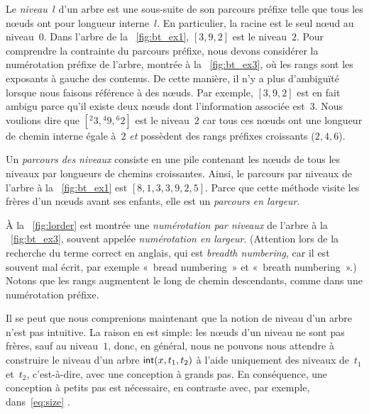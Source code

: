 
Le \emph{niveau}~\(l\) d'un arbre est une
sous-suite de son parcours préfixe telle
que tous les nœuds ont pour longueur
interne~\(l\). En particulier, la racine
est le seul nœud au niveau~\(0\). Dans l'arbre de la
\fig~\vref{fig:bt_ex1}, \([3,9,2]\) est le niveau~\(2\). Pour
comprendre la contrainte du parcours préfixe, nous devons considérer
la numérotation préfixe de l'arbre, montrée à la
\fig~\vref{fig:bt_ex3}, où les rangs sont les exposants à gauche des
contenus. De cette manière, il n'y a plus d'ambiguïté lorsque nous
faisons référence à des nœuds. Par exemple, \([3,9,2]\) est en
fait ambigu parce qu'il existe deux nœuds dont l'information
associée est~\(3\). Nous voulions dire que \([{}^{2}{3}, {}^{4}{9},
{}^{6}{2}]\) est le niveau~\(2\) car tous ces nœuds ont une
longueur de chemin interne égale à~\(2\) \emph{et} possèdent des rangs
préfixes croissants (\(2,4,6\)).

Un \emph{parcours des niveaux} consiste en une pile contenant les nœuds de tous les
niveaux par longueurs de chemins croissantes. Ainsi, le parcours par
niveaux de l'arbre à la \fig~\vref{fig:bt_ex1} est
\([8,1,3,3,9,2,5]\). Parce que cette méthode visite les frères d'un
nœuds avant ses enfants, elle est un \emph{parcours en
  largeur}.

À la \fig~\vref{fig:lorder} est montrée une \emph{numérotation par
  niveaux} de l'arbre à la \fig~\vref{fig:bt_ex3}, souvent appelée
\emph{numérotation en largeur}. (Attention lors de la recherche du terme correct en
anglais, qui est \emph{breadth numbering}, car il est souvent mal
écrit, par exemple «~bread numbering~» et «~breath numbering~».) Notons
que les rangs augmentent le long de chemin descendants, comme dans une
numérotation préfixe.

Il se peut que nous comprenions maintenant que la notion de niveau
d'un arbre n'est pas intuitive. La raison en est simple: les nœuds
d'un niveau ne sont pas frères, sauf au
niveau~\(1\), donc, en général, nous ne pouvons nous attendre à
construire le niveau d'un arbre \(\textsf{int}(x,t_1,t_2)\) à l'aide
uniquement des niveaux de~\(t_1\) et~\(t_2\), c'est-à-dire, avec une
conception à grands pas. En conséquence,
une conception à petits pas est nécessaire, en contraste avec, par
exemple,  dans~\eqref{eq:size}
.

